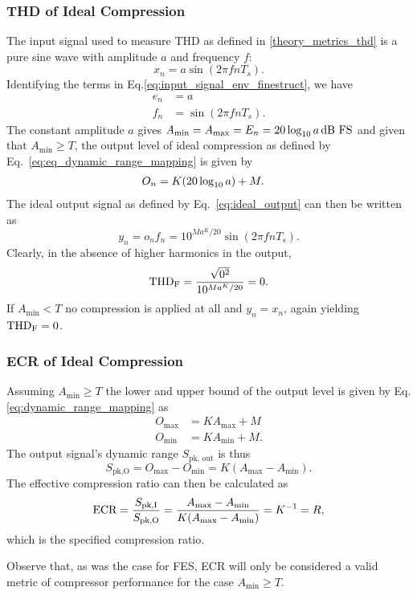 \documentclass[../main2.tex]{subfiles}
\begin{document}
\subsubsection{THD of Ideal Compression}
The input signal used to measure THD as defined in \ref{theory_metrics_thd} is a pure sine wave with amplitude $a$ and frequency $f$:
\begin{equation}
x_n = a \sin( 2 \pi f n T_s ).
\end{equation}
Identifying the terms in Eq.\eqref{eq:input_signal_env_finestruct}, we have
\begin{equation}
\begin{split}
e_n &= a \\
f_n &= \sin( 2 \pi f n T_s ).
\end{split}
\end{equation}
The constant amplitude $a$ gives $A_\text{min} = A_\text{max} = E_n = 20 \log_{10} a \mskip3mu\text{dB FS}$ and given that $A_\text{min} \geq T$, the output level of ideal compression as defined by Eq.~\eqref{eq:eq_dynamic_range_mapping} is given by
\begin{equation}
\begin{split}
O_n &= K (20 \log_{10} a) + M.
\end{split}
\end{equation}
The ideal output signal as defined by Eq.~\eqref{eq:ideal_output} can then be written as
\begin{equation}
y_n = o_n f_n = 10^{Ma^K/20} \sin(2 \pi f n T_s).
\end{equation}
Clearly, in the absence of higher harmonics in the output,
\begin{equation}
\text{THD}_\text{F} = \frac{\sqrt{0^2}}{10^{Ma^K/20}} = 0.
\end{equation}
If $A_\text{min} < T$ no compression is applied at all and $y_n = x_n$, again yielding $\text{THD}_\text{F} = 0$.

\subsubsection{ECR of Ideal Compression}
Assuming $A_\text{min} \geq T$ the lower and upper bound of the output level is given by Eq.\eqref{eq:dynamic_range_mapping} as
\begin{equation}
\begin{split}
O_\text{max} &= K A_\text{max} + M\\
O_\text{min} &= K A_\text{min} + M.
\end{split}
\end{equation}
The output signal's dynamic range $S_\text{pk, out}$ is thus
\begin{equation}
S_\text{pk,O} = O_\text{max} - O_\text{min} = K (A_\text{max} - A_\text{min}).\end{equation}
The effective compression ratio can then be calculated as
\begin{equation}
\text{ECR} = \frac{S_\text{pk,I}}{S_\text{pk,O}} = \frac{A_\text{max} - A_\text{min}}{K(A_\text{max} - A_\text{min})} = K^{-1} = R,
\end{equation}
which is the specified compression ratio.

Observe that, as was the case for FES, ECR will only be considered a valid metric of compressor performance for the case $A_\text{min} \geq T$.
\end{document}

